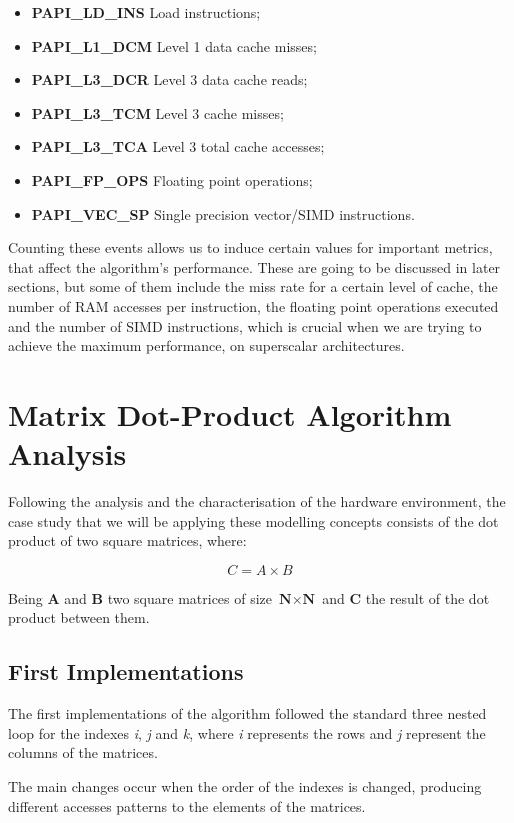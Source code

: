 \documentclass[twoside,twocolumn]{article}
\begin{document}
\begin{itemize}
    \item \textbf{PAPI\_LD\_INS} Load instructions;
    \item \textbf{PAPI\_L1\_DCM} Level 1 data cache misses;
    \item \textbf{PAPI\_L3\_DCR} Level 3 data cache reads;
    \item \textbf{PAPI\_L3\_TCM} Level 3 cache misses;
    \item \textbf{PAPI\_L3\_TCA} Level 3 total cache accesses;
    \item \textbf{PAPI\_FP\_OPS} Floating point operations;
    \item \textbf{PAPI\_VEC\_SP} Single precision vector/SIMD instructions.
\end{itemize}

Counting these events allows us to induce certain values for important metrics, that affect the algorithm's performance. These are going to be discussed in later sections, but some of them include the miss rate for a certain level of cache, the number of RAM accesses per instruction, the floating point operations executed and the number of SIMD instructions, which is crucial when we are trying to achieve the maximum performance, on superscalar architectures.

\section{Matrix Dot-Product Algorithm Analysis}

Following the analysis and the characterisation of the hardware environment, the case study that we will be applying these modelling concepts consists of the dot product of two square matrices, where:

$$C = A \times B$$

Being \textbf{A} and \textbf{B} two square matrices of size $\textbf{N} \times \textbf{N}$ and \textbf{C} the result of the dot product between them.

\subsection{First Implementations}

The first implementations of the algorithm followed the standard three nested loop for the indexes \emph{i}, \emph{j} and \emph{k}, where \emph{i} represents the rows and \emph{j} represent the columns of the matrices.

The main changes occur when the order of the indexes is changed, producing different accesses patterns to the elements of the matrices.
\end{document}
